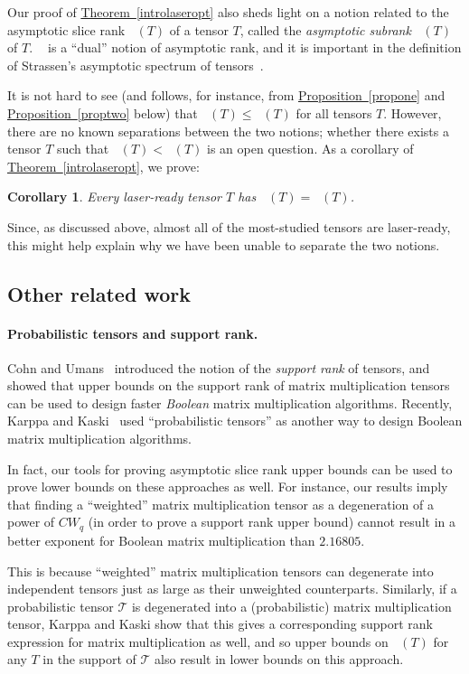\documentclass[11pt]{article}
\numberwithin{equation}{section}
\newtheorem{corollary}[theorem]{Corollary}
\theoremstyle{definition}
\theoremstyle{plain}
\newcommand{\expref}[2]{\hyperref[#2]{#1~\ref{#2}}}
\newcommand{\tsr}{\mathop{\tilde{\operatorname{S}}}}
\newcommand{\tqr}{\mathop{\tilde{\operatorname{Q}}}}
\theoremstyle{definition}
\begin{document}
Our proof of \expref{Theorem}{introlaseropt} also sheds light on a notion related to the asymptotic slice rank $\tsr(T)$ of a tensor $T$, called the \emph{asymptotic subrank} $\tqr(T)$ of $T$. $\tqr$ is a ``dual'' notion of asymptotic rank, and it is important in the definition of Strassen's asymptotic spectrum of tensors~\cite{strassenlaser1}. 

It is not hard to see (and follows, for instance, from \expref{Proposition}{propone} and \expref{Proposition}{proptwo} below) that $\tqr(T) \leq \tsr(T)$ for all tensors $T$. However, there are no known separations between the two notions; whether there exists a tensor $T$ such that $\tqr(T) < \tsr(T)$ is an open question. As a corollary of \expref{Theorem}{introlaseropt}, we prove:
\begin{corollary} \label{introsubrankcor}
Every laser-ready tensor $T$ has $\tqr(T) = \tsr(T)$.
\end{corollary}
\noindent Since, as discussed above, almost all of the most-studied tensors are laser-ready, this might help explain why we have been unable to separate the two notions.




%
\subsection{Other related work} \label{sec:relatedwork}

%
\paragraph{Probabilistic tensors and support rank.}
Cohn and Umans~\cite{cohn2013fast} introduced the notion of the \emph{support rank} of tensors, and showed that upper bounds on the support rank of matrix multiplication tensors can be used to design faster \emph{Boolean} matrix multiplication algorithms. Recently, Karppa and Kaski~\cite{karppa2019probabilistic} used ``probabilistic tensors'' as another way to design Boolean matrix multiplication algorithms. 

In fact, our tools for proving asymptotic slice rank upper bounds can be used to prove lower bounds on these approaches as well. For instance, our results imply that finding a ``weighted'' matrix multiplication tensor as a degeneration of a power of $CW_q$ (in order to prove a support rank upper bound) cannot result in a better exponent for Boolean matrix multiplication than $2.16805$. 

This is because ``weighted'' matrix multiplication tensors can degenerate into independent tensors just as large as their unweighted counterparts. Similarly, if a probabilistic tensor $\mathcal{T}$ is degenerated into a (probabilistic) matrix multiplication tensor, Karppa and Kaski show that this gives a corresponding support rank expression for matrix multiplication as well, and so upper bounds on $\tsr(T)$ for any $T$ in the support of $\mathcal{T}$ also result in lower bounds on this approach. 
\end{document}
